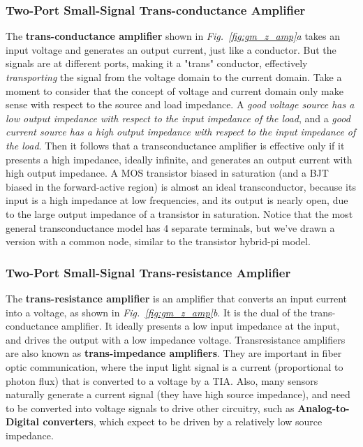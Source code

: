 \subsubsection{Two-Port Small-Signal Trans-conductance Amplifier}
The \textbf{trans-conductance amplifier} shown in \emph{Fig.~\ref{fig:gm_z_amp}a} takes an input voltage and generates an output current, just like a conductor.  But the signals are at different ports, making it a "trans" conductor, effectively \emph{transporting} the signal from the voltage domain to the current domain.  Take a moment to consider that the concept of voltage and current domain only make sense with respect to the source and load impedance.  A \textit{good voltage source has a low output impedance with respect to the input impedance of the load}, and a \textit{good current source has a high output impedance with respect to the input impedance of the load}.  Then it follows that a transconductance amplifier is effective only if it presents a high impedance, ideally infinite, and generates an output current with high output impedance.  A MOS transistor biased in saturation (and a BJT biased in the forward-active region) is almost an ideal transconductor, because its input is a high impedance at low frequencies, and its output is nearly open, due to the large output impedance of a transistor in saturation.  Notice that the most general transconductance model has 4 separate terminals, but we've drawn a version with a common node, similar to the transistor hybrid-pi model. 
\subsubsection{Two-Port Small-Signal Trans-resistance Amplifier}
The \textbf{trans-resistance amplifier} is an amplifier that converts an input current into a voltage, as shown in \emph{Fig.~\ref{fig:gm_z_amp}b}.  It is the dual of the trans-conductance amplifier.  It ideally presents a low input impedance at the input, and drives the output with a low impedance voltage.  Transresistance amplifiers are also known as \textbf{trans-impedance amplifiers}.  They are important in fiber optic communication, where the input light signal is a current (proportional to photon flux) that is converted to a voltage by a TIA.  Also, many sensors naturally generate a current signal (they have high source impedance), and need to be converted into voltage signals to drive other circuitry, such as \textbf{Analog-to-Digital converters}, which expect to be driven by a relatively low source impedance.  
